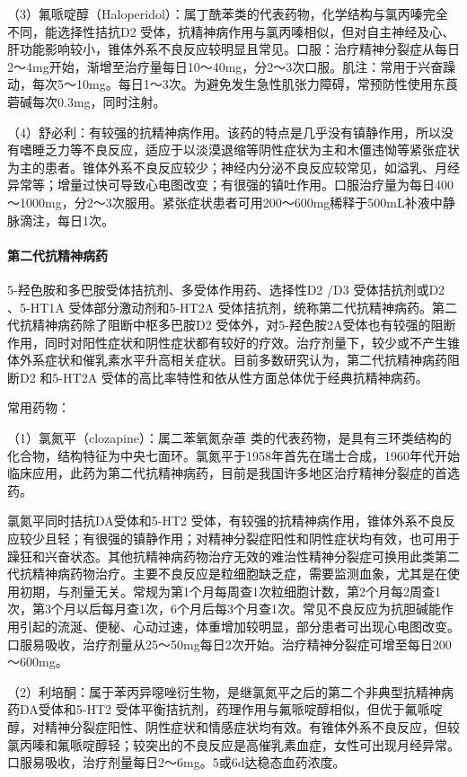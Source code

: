 （3）氟哌啶醇（Haloperidol）：属丁酰苯类的代表药物，化学结构与氯丙嗪完全不同，能选择性拮抗D{2}
受体，抗精神病作用与氯丙嗪相似，但对自主神经及心、肝功能影响较小，锥体外系不良反应较明显且常见。口服：治疗精神分裂症从每日2～4mg开始，渐增至治疗量每日10～40mg，分2～3次口服。肌注：常用于兴奋躁动，每次5～10mg。每日1～3次。为避免发生急性肌张力障碍，常预防性使用东莨菪碱每次0.3mg，同时注射。

（4）舒必利：有较强的抗精神病作用。该药的特点是几乎没有镇静作用，所以没有嗜睡乏力等不良反应，适应于以淡漠退缩等阴性症状为主和木僵违怮等紧张症状为主的患者。锥体外系不良反应较少；神经内分泌不良反应较常见，如溢乳、月经异常等；增量过快可导致心电图改变；有很强的镇吐作用。口服治疗量为每日400～1000mg，分2～3次服用。紧张症状患者可用200～600mg稀释于500mL补液中静脉滴注，每日1次。
\paragraph{第二代抗精神病药}

5-羟色胺和多巴胺受体拮抗剂、多受体作用药、选择性D{2} /D{3}
受体拮抗剂或D{2} 、5-HT{1A} 受体部分激动剂和5-HT{2A}
受体拮抗剂，统称第二代抗精神病药。第二代抗精神病药除了阻断中枢多巴胺D{2}
受体外，对5-羟色胺2A受体也有较强的阻断作用，同时对阳性症状和阴性症状都有较好的疗效。治疗剂量下，较少或不产生锥体外系症状和催乳素水平升高相关症状。目前多数研究认为，第二代抗精神病药阻断D{2}
和5-HT{2A} 受体的高比率特性和依从性方面总体优于经典抗精神病药。

常用药物：

（1）氯氮平（clozapine）：属二苯氧氮杂䓬
类的代表药物，是具有三环类结构的化合物，结构特征为中央七面环。氯氮平于1958年首先在瑞士合成，1960年代开始临床应用，此药为第二代抗精神病药，目前是我国许多地区治疗精神分裂症的首选药。

氯氮平同时拮抗DA受体和5-HT{2}
受体，有较强的抗精神病作用，锥体外系不良反应较少且轻；有很强的镇静作用；对精神分裂症阳性和阴性症状均有效，也可用于躁狂和兴奋状态。其他抗精神病药物治疗无效的难治性精神分裂症可换用此类第二代抗精神病药物治疗。主要不良反应是粒细胞缺乏症，需要监测血象，尤其是在使用初期，与剂量无关。常规为第1个月每周查1次粒细胞计数，第2个月每2周查1次，第3个月以后每月查1次，6个月后每3个月查1次。常见不良反应为抗胆碱能作用引起的流涎、便秘、心动过速，体重增加较明显，部分患者可出现心电图改变。口服易吸收，治疗剂量从25～50mg每日2次开始。治疗精神分裂症可增至每日200～600mg。

（2）利培酮：属于苯丙异噁唑衍生物，是继氯氮平之后的第二个非典型抗精神病药DA受体和5-HT{2}
受体平衡拮抗剂，药理作用与氟哌啶醇相似，但优于氟哌啶醇，对精神分裂症阳性、阴性症状和情感症状均有效。有锥体外系不良反应，但较氯丙嗪和氟哌啶醇轻；较突出的不良反应是高催乳素血症，女性可出现月经异常。口服易吸收，治疗剂量每日2～6mg。5或6d达稳态血药浓度。

